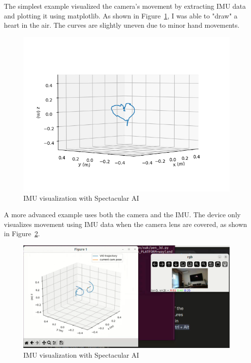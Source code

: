 The simplest example visualized the camera’s movement by extracting IMU data and plotting it using matplotlib. As shown in Figure~\ref{fig:IMU_visu}, I was able to "draw" a heart in the air. The curves are slightly uneven due to minor hand movements.

\begin{figure}[htbp]
	\centering
	\includegraphics[width=150mm, keepaspectratio]{figures/spectacular_ai_vio_visu.png}
	\caption{IMU visualization with Spectacular AI}
	\label{fig:IMU_visu}
\end{figure}

A more advanced example uses both the camera and the IMU. The device only visualizes movement using IMU data when the camera lens are covered, as shown in Figure~\ref{fig:3d_pen}.

\begin{figure}[htbp]
	\centering
	\includegraphics[width=150mm, keepaspectratio]{figures/3d_pen.png}
	\caption{IMU visualization with Spectacular AI}
	\label{fig:3d_pen}
\end{figure}

